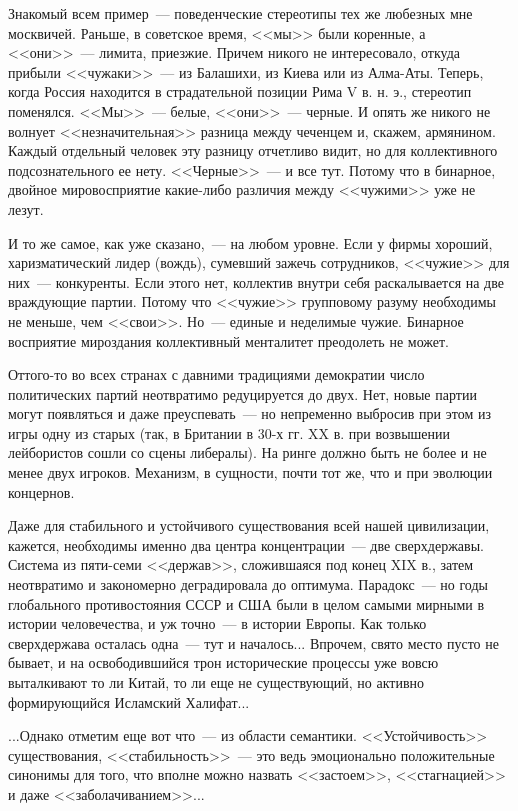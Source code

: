 \documentclass{scrbook}
\newcommand{\flqq}{<<}
\newcommand{\frqq}{>>}
\newcommand{\mdash}{~--- }
\newcommand{\commamdash}{~--- } %
\begin{document}
Знакомый всем пример{\mdash}поведенческие стереотипы тех же любезных мне москвичей. Раньше, в советское время, {\flqq}мы{\frqq} были коренные, а {\flqq}они{\frqq}{\mdash}лимита, приезжие. Причем никого не интересовало, откуда прибыли {\flqq}чужаки{\frqq}{\mdash}из Балашихи, из Киева или из Алма-Аты. Теперь, когда Россия находится в страдательной позиции Рима V в. н. э., стереотип поменялся. {\flqq}Мы{\frqq}{\mdash}белые, {\flqq}они{\frqq}{\mdash}черные. И опять же никого не волнует {\flqq}незначительная{\frqq} разница между чеченцем и, скажем, армянином. Каждый отдельный человек эту разницу отчетливо видит, но для коллективного подсознательного ее нету. {\flqq}Черные{\frqq}{\mdash}и все тут. Потому что в бинарное, двойное мировосприятие какие-либо различия между {\flqq}чужими{\frqq} уже не лезут.

И то же самое, как уже сказано,{\commamdash} на любом уровне. Если у фирмы хороший, харизматический лидер (вождь), сумевший зажечь сотрудников, {\flqq}чужие{\frqq} для них{\mdash}конкуренты. Если этого нет, коллектив внутри себя раскалывается на две враждующие партии. Потому что {\flqq}чужие{\frqq} групповому разуму необходимы не меньше, чем {\flqq}свои{\frqq}. Но{\mdash}единые и неделимые чужие. Бинарное восприятие мироздания коллективный менталитет преодолеть не может.

Оттого-то во всех странах с давними традициями демократии число политических партий неотвратимо редуцируется до двух. Нет, новые партии могут появляться и даже преуспевать{\mdash}но непременно выбросив при этом из игры одну из старых (так, в Британии в 30-х гг. XX в. при возвышении лейбористов сошли со сцены либералы). На ринге должно быть не более и не менее двух игроков. Механизм, в сущности, почти тот же, что и при эволюции концернов.

Даже для стабильного и устойчивого существования всей нашей цивилизации, кажется, необходимы именно два центра концентрации{\mdash}две сверхдержавы. Система из пяти-семи {\flqq}держав{\frqq}, сложившаяся под конец XIX в., затем неотвратимо и закономерно деградировала до оптимума. Парадокс{\mdash}но годы глобального противостояния СССР и США были в целом самыми мирными в истории человечества, и уж точно{\mdash}в истории Европы. Как только сверхдержава осталась одна{\mdash}тут и началось... Впрочем, свято место пусто не бывает, и на освободившийся трон исторические процессы уже вовсю выталкивают то ли Китай, то ли еще не существующий, но активно формирующийся Исламский Халифат...

...Однако отметим еще вот что{\mdash}из области семантики. {\flqq}Устойчивость{\frqq} существования, {\flqq}стабильность{\frqq}{\mdash}это ведь эмоционально положительные синонимы для того, что вполне можно назвать {\flqq}застоем{\frqq}, {\flqq}стагнацией{\frqq} и даже {\flqq}заболачиванием{\frqq}...
\end{document}
